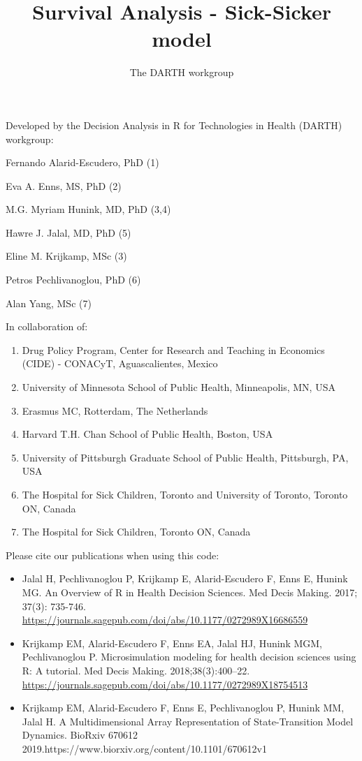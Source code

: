 \documentclass[
]{article}
\title{Survival Analysis - Sick-Sicker model}
\author{The DARTH workgroup}
\date{}
\providecommand{\tightlist}{%
  \setlength{\itemsep}{0pt}\setlength{\parskip}{0pt}}
\begin{document}
\maketitle

Developed by the Decision Analysis in R for Technologies in Health
(DARTH) workgroup:

Fernando Alarid-Escudero, PhD (1)

Eva A. Enns, MS, PhD (2)

M.G. Myriam Hunink, MD, PhD (3,4)

Hawre J. Jalal, MD, PhD (5)

Eline M. Krijkamp, MSc (3)

Petros Pechlivanoglou, PhD (6)

Alan Yang, MSc (7)

In collaboration of:

\begin{enumerate}
\def\labelenumi{\arabic{enumi}.}
\tightlist
\item
  Drug Policy Program, Center for Research and Teaching in Economics
  (CIDE) - CONACyT, Aguascalientes, Mexico
\item
  University of Minnesota School of Public Health, Minneapolis, MN, USA
\item
  Erasmus MC, Rotterdam, The Netherlands
\item
  Harvard T.H. Chan School of Public Health, Boston, USA
\item
  University of Pittsburgh Graduate School of Public Health, Pittsburgh,
  PA, USA
\item
  The Hospital for Sick Children, Toronto and University of Toronto,
  Toronto ON, Canada
\item
  The Hospital for Sick Children, Toronto ON, Canada
\end{enumerate}

Please cite our publications when using this code:

\begin{itemize}
\item
  Jalal H, Pechlivanoglou P, Krijkamp E, Alarid-Escudero F, Enns E,
  Hunink MG. An Overview of R in Health Decision Sciences. Med Decis
  Making. 2017; 37(3): 735-746.
  \url{https://journals.sagepub.com/doi/abs/10.1177/0272989X16686559}
\item
  Krijkamp EM, Alarid-Escudero F, Enns EA, Jalal HJ, Hunink MGM,
  Pechlivanoglou P. Microsimulation modeling for health decision
  sciences using R: A tutorial. Med Decis Making. 2018;38(3):400--22.
  \url{https://journals.sagepub.com/doi/abs/10.1177/0272989X18754513}
\item
  Krijkamp EM, Alarid-Escudero F, Enns E, Pechlivanoglou P, Hunink MM,
  Jalal H. A Multidimensional Array Representation of State-Transition
  Model Dynamics. BioRxiv 670612
  2019.https://www.biorxiv.org/content/10.1101/670612v1
\end{itemize}
\end{document}
